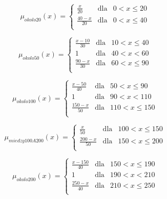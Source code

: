 \documentclass{classrep}
\begin{document}
\begin{equation}
\mu _{okolo20}(x) =  \left\{ \begin{array}{rcl}
\frac{x}{20} & \mbox{dla} & 0 < x \leq 20\\
\frac{40 - x}{20} & \mbox{dla} & 0 < x \leq 40\\
\end{array}\right.
\end{equation}

\begin{equation}
\mu _{okolo50}(x) =  \left\{ \begin{array}{rcl}
\frac{x - 10}{30} & \mbox{dla} & 10 < x \leq40\\
1 & \mbox{dla} & 40 < x < 60\\
\frac{90 - x}{30} & \mbox{dla} & 60 < x \leq 90\\
\end{array}\right.
\end{equation}

\begin{equation}
\mu _{okolo100}(x) =  \left\{ \begin{array}{rcl}
\frac{x - 50}{40} & \mbox{dla} & 50 < x \leq 90\\
1 & \mbox{dla} & 90 < x < 110\\
\frac{150 - x}{50} & \mbox{dla} & 110 < x \leq 150\\
\end{array}\right.
\end{equation}

\begin{equation}
\mu _{miedzy100A200}(x) =  \left\{ \begin{array}{rcl}
\frac{x}{50} & \mbox{dla} & 100 < x \leq 150\\
\frac{200- x}{50} & \mbox{dla} & 150 < x \leq 200\\
\end{array}\right.
\end{equation}

\begin{equation}
\mu _{okolo200}(x) =  \left\{ \begin{array}{rcl}
\frac{x - 150}{40} & \mbox{dla} & 150 < x \leq 190\\
1 & \mbox{dla} & 190 < x < 210\\
\frac{250 - x}{40} & \mbox{dla} & 210 < x \leq 250\\
\end{array}\right.
\end{equation}
\end{document}

